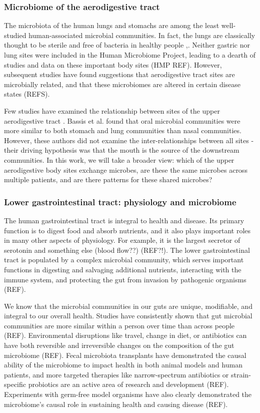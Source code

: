 \documentclass[12pt]{article}
\begin{document}
\subsubsection{Microbiome of the aerodigestive tract}
The microbiota of the human lungs and stomachs are among the least well-studied human-associated microbial communities. In fact, the lungs are classically thought to be sterile and free of bacteria in healthy people \cite{charslon-topographical-2011},\cite{bassis-source-2015}. Neither gastric nor lung sites were included in the Human Microbiome Project, leading to a dearth of studies and data on these important body sites (HMP REF). However, subsequent studies have found suggestions that aerodigestive tract sites are microbially related, and that these microbiomes are altered in certain disease states (REFS).

Few studies have examined the relationship between sites of the upper aerodigestive tract \cite{bassis-source-2015}. Bassis et al. found that oral microbial communities were more similar to both stomach and lung communities than nasal communities. However, these authors did not examine the inter-relationships between all sites - their driving hypothesis was that the mouth is the source of the downstream communities. In this work, we will take a broader view: which of the upper aerodigestive body sites exchange microbes, are these the same microbes across multiple patients, and are there  patterns for these shared microbes? 

\subsubsection{Lower gastrointestinal tract: physiology and microbiome}
The human gastrointestinal tract is integral to health and disease. Its primary function is to digest food and absorb nutrients, and it also plays important roles in many other aspects of physiology. For example, it is the largest secretor of serotonin and something else (blood flow??) (REF?!). The lower gastrointestinal tract is populated by a complex microbial community, which serves important functions in digesting and salvaging additional nutrients, interacting with the immune system, and protecting the gut from invasion by pathogenic organisms (REF). 

We know that the microbial communities in our guts are unique, modifiable, and integral to our overall health. Studies have consistently shown that gut microbial communities are more similar within a person over time than across people (REF). Environmental disruptions like travel, change in diet, or antibiotics can have both reversible and irreversible changes on the composition of the gut microbiome (REF). Fecal microbiota transplants have demonstrated the causal ability of the microbiome to impact health in both animal models and human patients, and more targeted therapies like narrow-spectrum antibiotics or strain-specific probiotics are an active area of research and development (REF). Experiments with germ-free model organisms have also clearly demonstrated the microbiome's causal role in sustaining health and causing disease (REF).
\end{document}
